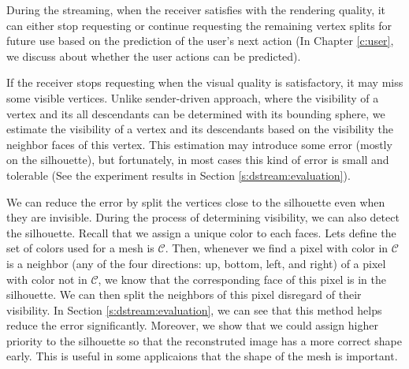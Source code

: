     During the streaming, when the receiver satisfies with the rendering quality, it 
    can either stop requesting or continue requesting the remaining vertex splits
    for future use based on the prediction of the user's next action 
    (In Chapter \ref{c:user}, we discuss about whether the user actions can be predicted).

    If the receiver stops requesting %
    when the visual quality is satisfactory, it may miss some visible vertices.
    Unlike sender-driven approach, where the visibility of a vertex and its all descendants
    can be determined with its bounding sphere, we estimate the visibility of 
    a vertex and its descendants based on the visibility the neighbor faces of this vertex. 
    This estimation may introduce some error (mostly on the silhouette), 
    but fortunately, in most cases this kind of error is small and tolerable
    (See the experiment results in Section \ref{s:dstream:evaluation}).

    We can reduce the error by split the vertices close to the silhouette even 
    when they are invisible. During the process of determining visibility, we can also
    detect the silhouette. Recall that we assign a unique color to each faces.
    Lets define the set of colors used for a mesh is $\mathcal{C}$.  
    Then, whenever we find a pixel with color in $\mathcal{C}$ 
    is a neighbor (any of the four directions: up, bottom, left, and right)
    of a pixel with color not in $\mathcal{C}$, 
    we know that the corresponding face of this pixel is in the silhouette.
    We can then split the neighbors of this pixel disregard of their visibility.
    In Section \ref{s:dstream:evaluation}, we can see that this method helps
    reduce the error significantly. Moreover, we show that we could assign
    higher priority to the silhouette so that the reconstruted image has 
    a more correct shape early. This is useful in some applicaions that the
    shape of the mesh is important.
    
